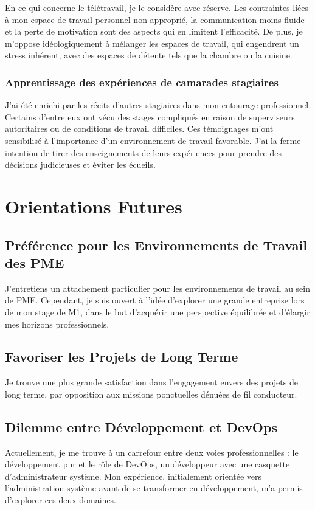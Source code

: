En ce qui concerne le télétravail, je le considère avec réserve.
Les contraintes liées à mon espace de travail personnel non approprié, la communication moins fluide et la perte de motivation sont des aspects qui en limitent l'efficacité.
De plus, je m'oppose idéologiquement à mélanger les espaces de travail, qui engendrent un stress inhérent, avec des espaces de détente tels que la chambre ou la cuisine.

\subsubsection{Apprentissage des expériences de camarades stagiaires}
J'ai été enrichi par les récits d'autres stagiaires dans mon entourage professionnel.
Certains d'entre eux ont vécu des stages compliqués en raison de superviseurs autoritaires ou de conditions de travail difficiles.
Ces témoignages m'ont sensibilisé à l'importance d'un environnement de travail favorable.
J'ai la ferme intention de tirer des enseignements de leurs expériences pour prendre des décisions judicieuses et éviter les écueils.


\section{Orientations Futures}
\subsection{Préférence pour les Environnements de Travail des PME}
J'entretiens un attachement particulier pour les environnements de travail au sein de PME.
Cependant, je suis ouvert à l'idée d'explorer une grande entreprise lors de mon stage de M1, dans le but d'acquérir une perspective équilibrée et d'élargir mes horizons professionnels.

\subsection{Favoriser les Projets de Long Terme}
Je trouve une plus grande satisfaction dans l'engagement envers des projets de long terme, par opposition aux missions ponctuelles dénuées de fil conducteur.

\subsection{Dilemme entre Développement et DevOps}
Actuellement, je me trouve à un carrefour entre deux voies professionnelles : le développement pur et le rôle de DevOps, un développeur avec une casquette d'administrateur système.
Mon expérience, initialement orientée vers l'administration système avant de se transformer en développement, m'a permis d'explorer ces deux domaines.

